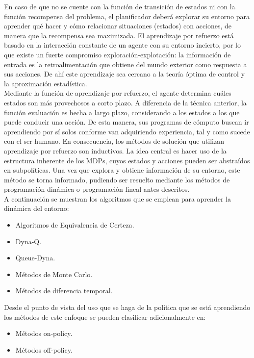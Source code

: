 En caso de que no se cuente con la función de transición de estados ni con la función recompensa del problema, el planificador deberá explorar su entorno para aprender qué hacer y cómo relacionar situaciones (estados) con acciones, de manera que la recompensa sea maximizada. El aprendizaje por refuerzo está basado en la interacción constante de un agente con su entorno incierto, por lo que existe un fuerte compromiso exploración-explotación: la información de entrada es la retroalimentación que obtiene del mundo exterior como respuesta a sus acciones. De ahí este aprendizaje sea cercano a la teoría óptima de control y la aproximación estadística.\\

Mediante la función de aprendizaje por refuerzo, el agente determina cuáles estados son más provechosos a corto plazo. A diferencia de la técnica anterior, la función evaluación es hecha a largo plazo, considerando a los estados a los que puede conducir una acción. De esta manera, sus programas de cómputo buscan ir aprendiendo por sí solos conforme van adquiriendo experiencia, tal y como sucede con el ser humano. En consecuencia, los métodos de solución que utilizan aprendizaje por refuerzo son inductivos. La idea central es hacer uso de la estructura inherente de los MDPs, cuyos estados y acciones pueden ser abstraídos en subpolíticas. Una vez que explora y obtiene información de su entorno, este método se torna informado, pudiendo ser resuelto mediante los métodos de programación dinámica o programación lineal antes descritos.\\

A continuación se muestran los algoritmos que se emplean para aprender la dinámica del entorno:
\begin{itemize}
	\item Algoritmos de Equivalencia de Certeza.
	\item Dyna-Q.
	\item Queue-Dyna.
	\item Métodos de Monte Carlo.
	\item Métodos de diferencia temporal.
\end{itemize}

Desde el punto de vista del uso que se haga de la política que se está aprendiendo los métodos de este enfoque se pueden clasificar adicionalmente en:
\begin{itemize}
	\item Métodos on-policy.
	\item Métodos off-policy.
\end{itemize}
